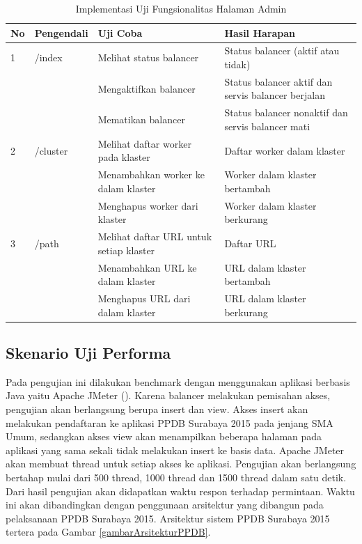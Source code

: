 \documentclass{ta-its}
\begin{document}
				\begin{longtable}{|p{}|p{}|p{}|p{}|} %
					
					\caption{Implementasi Uji Fungsionalitas Halaman Admin} \label{tabelUjiFungsionalitas} \\
					\hline
					\textbf{No} & \textbf{Pengendali} & \textbf{Uji Coba} & \textbf{Hasil Harapan} \\ \hline
					
					\endhead
					\endfoot
					\endlastfoot
					
					
					1 & /index & Melihat status balancer & Status balancer (aktif atau tidak) \\ \cline{3-4}
					&& Mengaktifkan	balancer & Status balancer aktif dan servis balancer berjalan \\ \cline{3-4}
					&& Mematikan balancer & Status balancer nonaktif dan servis balancer mati \\ \hline
					2 & /cluster & Melihat daftar worker pada klaster & Daftar worker dalam klaster \\ \cline{3-4}
					&& Menambahkan worker ke dalam klaster & Worker dalam klaster bertambah \\ \cline{3-4}
					&& Menghapus worker dari klaster & Worker dalam klaster berkurang \\ \hline
					3 & /path & Melihat daftar URL untuk setiap klaster & Daftar URL \\ \cline{3-4}
					&& Menambahkan URL ke dalam klaster & URL dalam klaster bertambah \\ \cline{3-4}
					&& Menghapus URL dari dalam klaster & URL dalam klaster berkurang \\ \hline
					
				\end{longtable}
			
			\subsection{Skenario Uji Performa}
				Pada pengujian ini dilakukan benchmark dengan menggunakan aplikasi berbasis Java yaitu Apache JMeter (). Karena balancer melakukan pemisahan akses, pengujian akan berlangsung berupa insert dan view. Akses insert akan melakukan pendaftaran ke aplikasi PPDB Surabaya 2015 pada jenjang SMA Umum, sedangkan akses view akan menampilkan beberapa halaman pada aplikasi yang sama sekali tidak melakukan insert ke basis data. Apache JMeter akan	membuat thread untuk setiap akses ke aplikasi. Pengujian akan berlangsung bertahap mulai dari 500 thread, 1000 thread dan 1500 thread dalam satu detik. Dari hasil pengujian akan didapatkan waktu respon terhadap permintaan. Waktu ini akan dibandingkan dengan penggunaan arsitektur yang dibangun pada pelaksanaan PPDB Surabaya 2015. Arsitektur sistem PPDB Surabaya 2015 tertera pada Gambar \ref{gambarArsitekturPPDB}.
		
\end{document}
